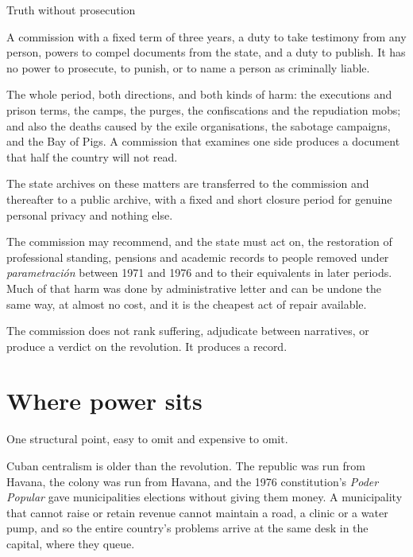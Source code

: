 \begin{design}{Truth without prosecution}
\label{d:truth}
\begin{rules}
 A commission with a fixed term of three years, a duty to take
testimony from any person, powers to compel documents from the state, and a
duty to publish. It has no power to prosecute, to punish, or to name a person
as criminally liable.

 The whole period, both directions, and both kinds of harm: the
executions and prison terms, the camps, the purges, the confiscations and the
repudiation mobs; and also the deaths caused by the exile organisations, the
sabotage campaigns, and the Bay of Pigs. A commission that examines one side
produces a document that half the country will not read.

 The state archives on these matters are transferred to the
commission and thereafter to a public archive, with a fixed and short closure
period for genuine personal privacy and nothing else.

 The commission may recommend, and the state
must act on, the restoration of professional standing, pensions and academic
records to people removed under \emph{parametraci\'on} between 1971 and 1976
and to their equivalents in later periods. Much of that harm was done by
administrative letter and can be undone the same way, at almost no cost, and it
is the cheapest act of repair available.

 The commission does not rank suffering, adjudicate
between narratives, or produce a verdict on the revolution. It produces a record.
\end{rules}
\end{design}

\section{Where power sits}

One structural point, easy to omit and expensive to omit.

Cuban centralism is older than the revolution. The republic was run from Havana,
the colony was run from Havana, and the 1976 constitution's \emph{Poder Popular}
gave municipalities elections without giving them money. A municipality that
cannot raise or retain revenue cannot maintain a road, a clinic or a water
pump, and so the entire country's problems arrive at the same desk in the
capital, where they queue.

